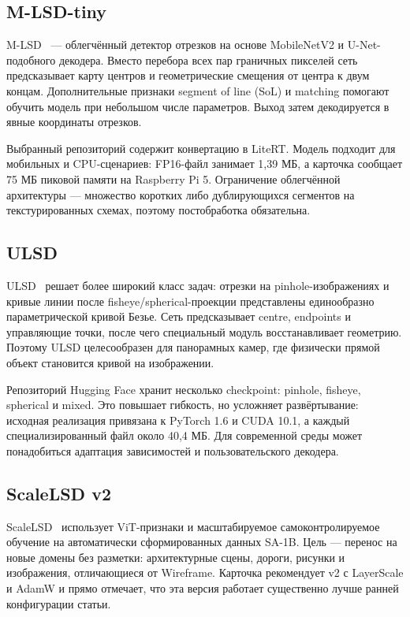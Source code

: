 \documentclass[a4paper,12pt]{extreport}
\begin{document}
\subsection{M-LSD-tiny}

M-LSD~\cite{gu} --- облегчённый детектор отрезков на основе MobileNetV2 и U-Net-подобного декодера. Вместо перебора всех пар граничных пикселей сеть предсказывает карту центров и геометрические смещения от центра к двум концам. Дополнительные признаки segment of line (SoL) и matching помогают обучить модель при небольшом числе параметров. Выход затем декодируется в явные координаты отрезков.

Выбранный репозиторий содержит конвертацию в LiteRT. Модель подходит для мобильных и CPU-сценариев: FP16-файл занимает 1,39 МБ, а карточка сообщает 75 МБ пиковой памяти на Raspberry Pi 5. Ограничение облегчённой архитектуры --- множество коротких либо дублирующихся сегментов на текстурированных схемах, поэтому постобработка обязательна.

\subsection{ULSD}

ULSD~\cite{li} решает более широкий класс задач: отрезки на pinhole-изображениях и кривые линии после fisheye/spherical-проекции представлены единообразно параметрической кривой Безье. Сеть предсказывает centre, endpoints и управляющие точки, после чего специальный модуль восстанавливает геометрию. Поэтому ULSD целесообразен для панорамных камер, где физически прямой объект становится кривой на изображении.

Репозиторий Hugging Face хранит несколько checkpoint: pinhole, fisheye, spherical и mixed. Это повышает гибкость, но усложняет развёртывание: исходная реализация привязана к PyTorch 1.6 и CUDA 10.1, а каждый специализированный файл около 40,4 МБ. Для современной среды может понадобиться адаптация зависимостей и пользовательского декодера.

\subsection{ScaleLSD v2}

ScaleLSD~\cite{ke} использует ViT-признаки и масштабируемое самоконтролируемое обучение на автоматически сформированных данных SA-1B. Цель --- перенос на новые домены без разметки: архитектурные сцены, дороги, рисунки и изображения, отличающиеся от Wireframe. Карточка рекомендует v2 с LayerScale и AdamW и прямо отмечает, что эта версия работает существенно лучше ранней конфигурации статьи.
\end{document}
